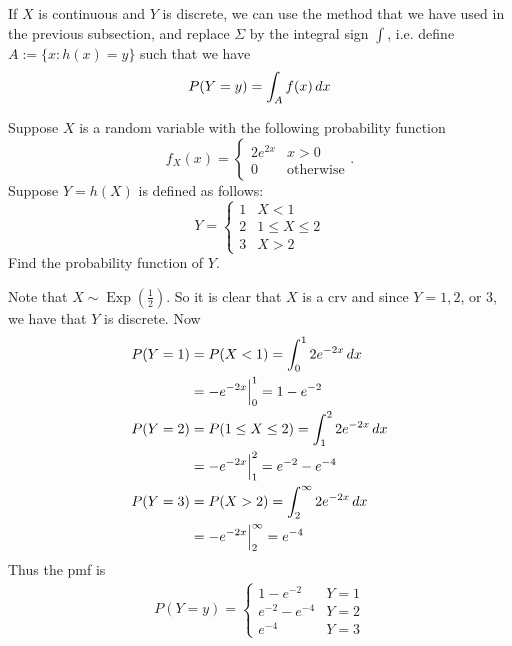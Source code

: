 \documentclass[notoc,notitlepage]{tufte-book}
\DeclareMathOperator{\Exp}{Exp }
\begin{document}
If $X$ is continuous and $Y$ is discrete, we can use the method that we have used in the previous subsection, and replace $\Sigma$ by the integral sign $\int$, i.e. define $A := \{x : h(x) = y\}$ such that we have
\begin{equation*}
  P(Y = y) = \int_{A} f(x) \mathop{}\!d{x}
\end{equation*}

\begin{eg}[Example 2.9]\label{eg:cont_x_disc_y}
  Suppose $X$ is a random variable with the following probability function
  \begin{equation*}
    f_X(x) = \begin{cases}
      2e^{2x} & x > 0 \\
      0       & \text{otherwise}
    \end{cases}.
  \end{equation*}
  Suppose $Y = h(X)$ is defined as follows:
  \begin{equation*}
    Y = \begin{cases}
      1 & X < 1 \\
      2 & 1 \leq X \leq 2 \\
      3 & X > 2
    \end{cases}
  \end{equation*}
  Find the probability function of $Y$.

  \begin{solution}
    Note that $X \sim \Exp(\frac{1}{2})$. So it is clear that $X$ is a crv and since $Y = 1, 2$, or $3$, we have that $Y$ is discrete. Now
    \begin{align*}
      P(Y = 1) &= P(X < 1) = \int_{0}^{1} 2e^{-2x} \mathop{}\!d{x} \\
               &= -e^{-2x} \Big|_{0}^{1} = 1 - e^{-2} \\
      P(Y = 2) &= P(1 \leq X \leq 2) = \int_{1}^{2} 2e^{-2x} \mathop{}\!d{x} \\
               &= -e^{-2x} \Big|_{1}^{2} = e^{-2} - e^{-4} \\
      P(Y = 3) &= P(X > 2) = \int_{2}^{\infty} 2e^{-2x} \mathop{}\!d{x} \\
               &= -e^{-2x} \Big|_{2}^{\infty} = e^{-4}
    \end{align*}
    Thus the pmf is
    \begin{align*}
      P(Y = y) = \begin{cases}
        1 - e^{-2}      & Y = 1 \\
        e^{-2} - e^{-4} & Y = 2 \\
        e^{-4}          & Y = 3
      \end{cases}
    \end{align*}
  \end{solution}
\end{eg}
\end{document}
